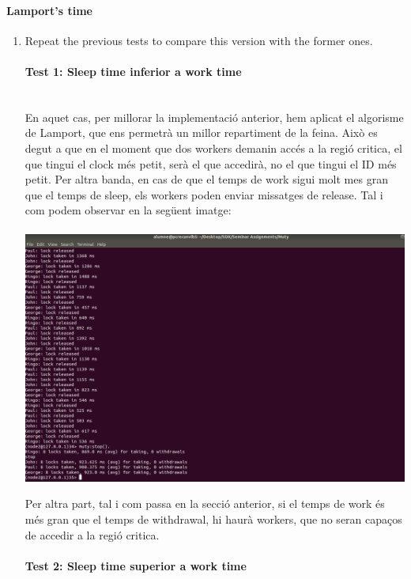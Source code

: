 \documentclass[a4paper, 10pt]{article}
\begin{document}
\paragraph[bold]{Lamport’s time}
\begin{enumerate}
\item Repeat the previous tests to compare this version with the former ones.
\paragraph[bold]{Test 1: Sleep time inferior a work time\\\\}
En aquet cas, per millorar la implementació anterior, hem aplicat el algorisme de Lamport, que ens permetrà un millor repartiment de la feina.
Això es degut a que en el moment que dos workers demanin accés a la regió critica, el que tingui el clock més petit, serà el que accedirà, no el que tingui el ID més petit. Per altra banda, en cas de que el temps de work sigui molt mes gran que el temps de sleep, els workers poden enviar missatges de release. Tal i com podem observar en la següent imatge:\\\\

\includegraphics[width=\textwidth]{lamp-1}

Per altra part, tal i com passa en la secció anterior, si el temps de work és més gran que el temps de withdrawal, hi haurà workers, que no seran capaços de accedir a la regió critica.

\newpage
\paragraph[bold]{Test 2: Sleep time superior a work time\\\\}



\end{enumerate}
\end{document}
